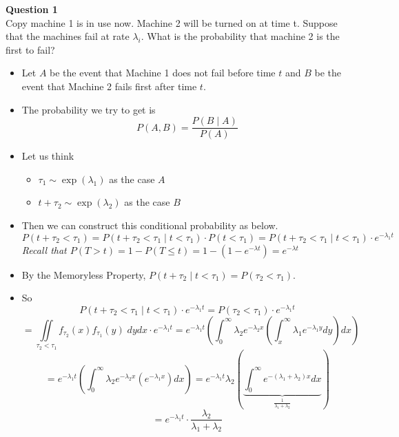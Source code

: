 \documentclass[12pt]{article}
\begin{document}


\noindent
\textbf{Question 1}\\
Copy machine 1 is in use now. Machine 2 will be turned on at time t.
Suppose that the machines fail at rate $\lambda_i$. What is the probability that machine 2 is the first to fail?

\begin{itemize}
    \item Let $A$ be the event that Machine 1 does not fail before time $t$ and $B$ be the event that Machine 2 fails first after time $t$.
    \item The probability we try to get is 
    $$P(A,B) = \frac{P(B\;|\;A)}{P(A)}$$
    \item Let us think 
    \begin{itemize}
        \item $\tau_1 \sim \exp(\lambda_1)$ as the case $A$
        \item $t+\tau_2 \sim \exp(\lambda_2)$ as the case $B$
    \end{itemize}
    
    \item Then we can construct this conditional probability as below.
    $$P(t+\tau_2 < \tau_1) = P(t+\tau_2<\tau_1\;|\; t<\tau_1)\cdot P(t<\tau_1)
    =P(t+\tau_2<\tau_1\;|\; t<\tau_1)\cdot e^{-\lambda_1 t}$$
    {\sl Recall that $P(T>t) = 1-P(T\le t)=1-\left(1-e^{-\lambda t}\right) = e^{-\lambda t}$}
    
    \item By the Memoryless Property, $P(t+\tau_2\;|\; t<\tau_1) = P(\tau_2<\tau_1)$.
    \item So 
    $$P(t+\tau_2<\tau_1\;|\; t<\tau_1)\cdot e^{-\lambda_1 t} =  P(\tau_2<\tau_1) \cdot e^{-\lambda_1 t}$$
    $$=\iint\limits_{\tau_2<\tau_1} f_{\tau_2}(x)f_{\tau_1}(y)\;dydx\cdot e^{-\lambda_1 t}
    =e^{-\lambda_1 t}\left(\int_0^\infty \lambda_2 e^{-\lambda_2 x}\left(\int_x^\infty \lambda_1 e^{-\lambda_1 y}dy\right)dx\right)$$
    $$=e^{-\lambda_1 t}\left(\int_0^\infty \lambda_2 e^{-\lambda_2 x}\left(
    e^{-\lambda_1 x}
    \right)dx\right)
    =e^{-\lambda_1 t}\lambda_2\left(\underbrace{\int_0^\infty  e^{-(\lambda_1+\lambda_2) x}
    dx}_{\frac{1}{\lambda_1+\lambda_2}}\right)$$
    $$=e^{-\lambda_1 t}\cdot\frac{\lambda_2}{\lambda_1+\lambda_2}$$
    

    
\end{itemize}
\end{document}
